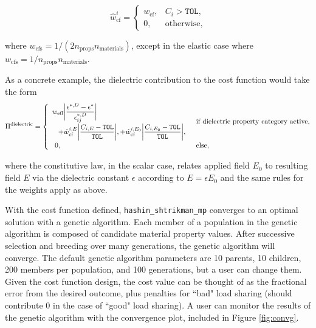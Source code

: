 \documentclass[letterpaper,12pt]{formatfile}
\begin{document}
\begin{equation}
\hat{w}_{\text{cf}}^{i} = 
\begin{cases}
w_{\text{cf}}, & C_{i} >  \texttt{TOL}, \\
0, & \text{otherwise},
\end{cases}
\end{equation}

\noindent where $w_{\text{cfs}} = 1/(2n_{\text{props}}n_{\text{materials}})$, except in the elastic case where $w_{\text{cfs}} = 1/n_{\text{props}}n_{\text{materials}}$.

As a concrete example, the dielectric contribution to the cost function would take the form
\begin{equation}
\Pi^{\text{dielectric}} =
\begin{cases}
\begin{array}{l}
w_{\text{eff}} \biggl\vert\displaystyle\frac{\epsilon^{*,D} - \epsilon^{*}}{\epsilon_{ij}^{*,D}}\biggr\vert \\[10pt]
\hspace{3mm} + \hat{w}_{\text{cf}}^{i, E} \biggl\vert\displaystyle\frac{C_{i,E}-\texttt{TOL}}{\texttt{TOL}}\biggr\vert, 
+ \hat{w}_{\text{cf}}^{i, E_{0}} \biggl\vert\displaystyle\frac{C_{i,E_{0}}-\texttt{TOL}}{\texttt{TOL}}\biggr\vert,
\end{array} & \text{if dielectric property category active}, \\
\hspace{3mm} 0, & \text{else},
\end{cases}
\label{eqn:pi-elastic}
\end{equation}

\noindent where the constitutive law, in the scalar case, relates applied field $E_{0}$ to resulting field $E$ via the dielectric constant $\epsilon$ according to $E = \epsilon E_{0}$ and the same rules for the weights apply as above.  

With the cost function defined, \verb|hashin_shtrikman_mp| converges to an optimal solution with a genetic algorithm. Each member of a population in the genetic algorithm is composed of candidate material property values. After successive selection and breeding over many generations, the genetic algorithm will converge. The default genetic algorithm parameters are 10 parents, 10 children, 200 members per population, and 100 generations, but a user can change them. Given the cost function design, the cost value can be thought of as the fractional error from the desired outcome, plus penalties for ``bad" load sharing (should contribute 0 in the case of ``good" load sharing). A user can monitor the results of the genetic algorithm with the convergence plot, included in Figure \ref{fig:convg}. 
\end{document}
